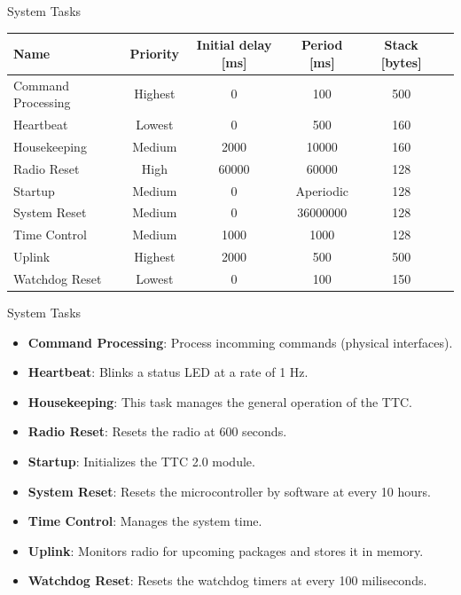 \begin{frame}{System Tasks}

\begin{table}[!h]\scriptsize
    \centering
    \label{tab:firmware-tasks}
    \begin{tabular}{lccccc}
        \toprule[1.5pt]
        \textbf{Name}          & \textbf{Priority} & \textbf{Initial delay [ms]} & \textbf{Period [ms]} & \textbf{Stack [bytes]} \\
        \midrule
        Command Processing     & Highest & 0     & 100       & 500 \\
        Heartbeat              & Lowest  & 0     & 500       & 160 \\
        Housekeeping           & Medium  & 2000  & 10000     & 160 \\
        Radio Reset            & High    & 60000 & 60000     & 128 \\
        Startup                & Medium  & 0     & Aperiodic & 128 \\
        System Reset           & Medium  & 0     & 36000000  & 128 \\
        Time Control           & Medium  & 1000  & 1000      & 128 \\
        Uplink                 & Highest & 2000  & 500       & 500 \\
        Watchdog Reset         & Lowest  & 0     & 100       & 150 \\
        \bottomrule[1.5pt]
    \end{tabular}
\end{table}

\end{frame}

\begin{frame}{System Tasks}

    \begin{itemize}
        \item \textbf{Command Processing}: Process incomming commands (physical interfaces).
        \item \textbf{Heartbeat}: Blinks a status LED at a rate of 1 Hz.
        \item \textbf{Housekeeping}: This task manages the general operation of
the TTC.
        \item \textbf{Radio Reset}: Resets the radio at 600 seconds.
        \item \textbf{Startup}: Initializes the TTC 2.0 module.
        \item \textbf{System Reset}: Resets the microcontroller by software at every 10 hours.
        \item \textbf{Time Control}: Manages the system time.
        \item \textbf{Uplink}: Monitors radio for upcoming packages and stores it in memory.
        \item \textbf{Watchdog Reset}: Resets the watchdog timers at every 100 miliseconds.
    \end{itemize}

 \end{frame}


